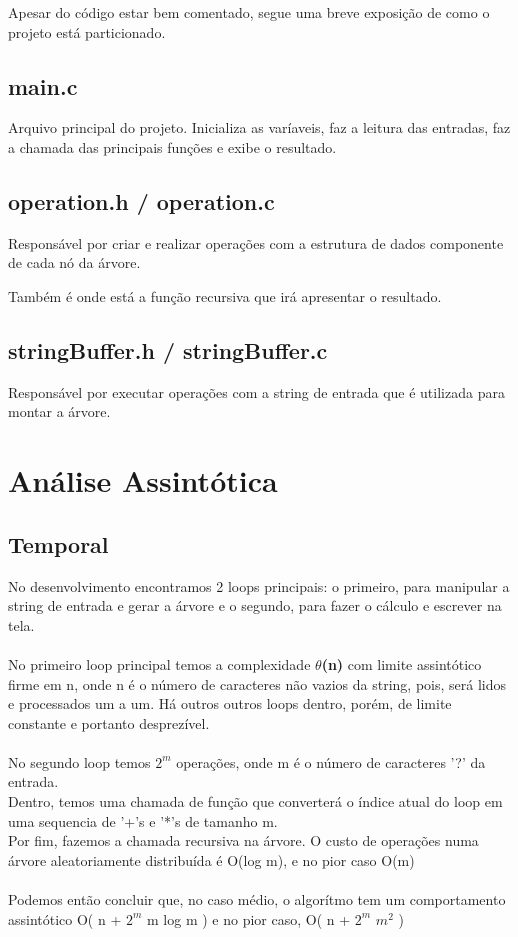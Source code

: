 \documentclass{article}
\begin{document}
Apesar do código estar bem comentado, segue uma breve exposição de como o projeto está particionado.

\subsection{main.c}
Arquivo principal do projeto. Inicializa as varíaveis, faz a leitura das entradas, faz a chamada das principais funções e exibe o resultado.

\subsection{operation.h / operation.c}
Responsável por criar e realizar operações com a estrutura de dados componente de cada nó da árvore.

Também é onde está a função recursiva que irá apresentar o resultado.

\subsection{stringBuffer.h / stringBuffer.c}
Responsável por executar operações com a string de entrada que é utilizada para montar a árvore.

\section{Análise Assintótica}
\subsection{Temporal}
No desenvolvimento encontramos 2 loops principais: o primeiro, para manipular a string de entrada e gerar a árvore e o segundo, para fazer o cálculo e escrever na tela.
\\
\\
No primeiro loop principal temos a complexidade \textbf{$\theta$(n)} com limite assintótico firme em n, onde n é o número de caracteres não vazios da string, pois, será lidos e processados um a um. Há outros outros loops dentro, porém, de limite constante e portanto desprezível.
\\
\\
No segundo loop temos $2^m$ operações, onde m é o número de caracteres '?' da entrada.
\\
Dentro, temos uma chamada de função que converterá o índice atual do loop em uma sequencia de '+'s e '*'s de tamanho m.
\\
Por fim, fazemos a chamada recursiva na árvore. O custo de operações numa árvore aleatoriamente distribuída é O(log m), e no pior caso O(m)
\\
\\
Podemos então concluir que, no caso médio, o algorítmo tem um comportamento assintótico O( n + $2^m$ m log m ) e no pior caso, O( n + $2^m$ $m^2$ )
\end{document}
